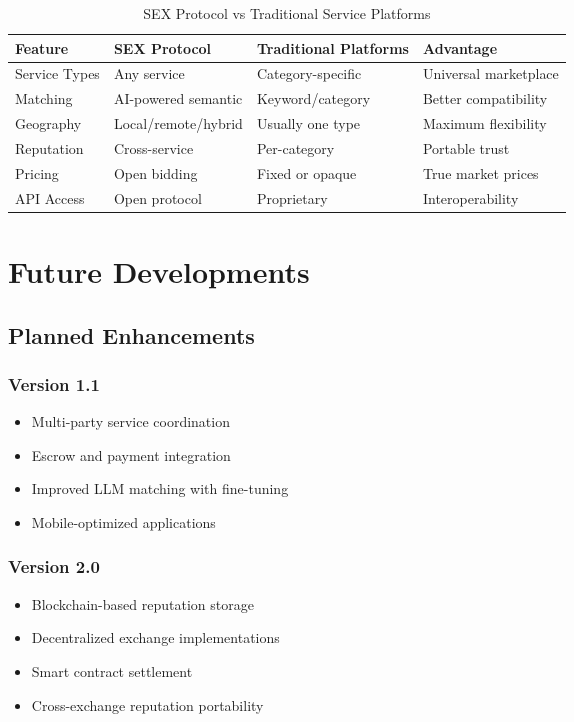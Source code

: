 \documentclass[11pt,a4paper]{article}
\begin{document}
\begin{table}[H]
\centering
\begin{tabularx}{\textwidth}{|l|X|X|X|}
\hline
\textbf{Feature} & \textbf{SEX Protocol} & \textbf{Traditional Platforms} & \textbf{Advantage} \\
\hline
Service Types & Any service & Category-specific & Universal marketplace \\
Matching & AI-powered semantic & Keyword/category & Better compatibility \\
Geography & Local/remote/hybrid & Usually one type & Maximum flexibility \\
Reputation & Cross-service & Per-category & Portable trust \\
Pricing & Open bidding & Fixed or opaque & True market prices \\
API Access & Open protocol & Proprietary & Interoperability \\
\hline
\end{tabularx}
\caption{SEX Protocol vs Traditional Service Platforms}
\end{table}

\section{Future Developments}

\subsection{Planned Enhancements}

\subsubsection{Version 1.1}
\begin{itemize}
    \item Multi-party service coordination
    \item Escrow and payment integration
    \item Improved LLM matching with fine-tuning
    \item Mobile-optimized applications
\end{itemize}

\subsubsection{Version 2.0}
\begin{itemize}
    \item Blockchain-based reputation storage
    \item Decentralized exchange implementations
    \item Smart contract settlement
    \item Cross-exchange reputation portability
\end{itemize}
\end{document}

